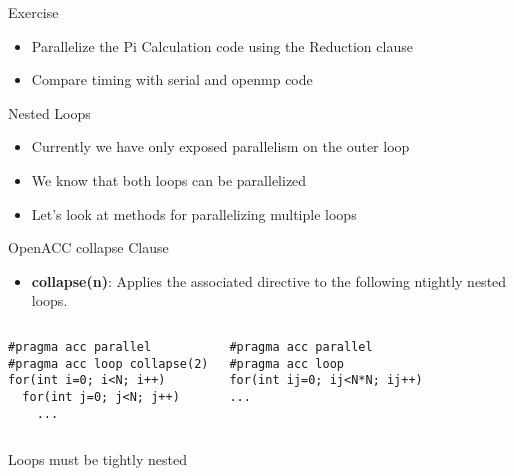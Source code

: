 \documentclass[10pt,t]{beamer}
\begin{document}
\begin{frame}{Exercise}
  \begin{itemize}
    \item Parallelize the Pi Calculation code using the Reduction clause
    \item Compare timing with serial and openmp code
  \end{itemize}
\end{frame}

\begin{frame}[c]{Nested Loops}
  \begin{itemize}
    \item Currently we have only exposed parallelism on the outer loop
    \item We know that both loops can be parallelized
    \item Let’s look at methods for parallelizing multiple loops
  \end{itemize}
\end{frame}

\begin{frame}[fragile]{OpenACC collapse Clause}
  \begin{itemize}
  \item[] \textbf{\textcolor{lubrown}{collapse(n)}}: Applies the associated directive to the following ntightly nested loops.
  \end{itemize}
  \begin{columns}
    \column{9cm}
    \begin{exampleblock}{}
      \begin{columns}[c]
        \column{3.5cm}
        \begin{lstlisting}[basicstyle=\small\ttfamily,language=OmpC]
#pragma acc parallel 
#pragma acc loop collapse(2)
for(int i=0; i<N; i++)
  for(int j=0; j<N; j++)
    ...
        \end{lstlisting}
        \column{0.5cm}
        \fontsize{85}{20}\selectfont{\color{lubrown}$\Rightarrow$}
        \column{3.5cm}
        \begin{lstlisting}[basicstyle=\small\ttfamily,language=OmpC]
#pragma acc parallel 
#pragma acc loop 
for(int ij=0; ij<N*N; ij++)
...
        \end{lstlisting}
      \end{columns}
    \end{exampleblock}
  \end{columns}
  \vspace{0.25cm}
 Loops must be tightly nested
\end{frame}
\end{document}
